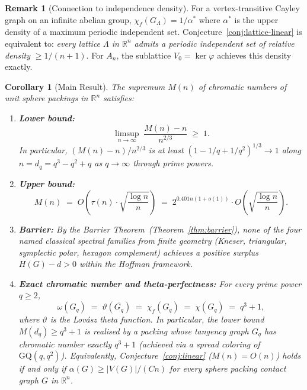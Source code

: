 \documentclass{article}
\newtheorem{corollary}[theorem]{Corollary}
\theoremstyle{definition}
\newtheorem{remark}[theorem]{Remark}
\begin{document}
\begin{remark}[Connection to independence density]\label{rem:indep-density}
For a vertex-transitive Cayley graph on an infinite abelian group, $\chi_f(G_\Lambda) = 1/\alpha^*$ where $\alpha^*$ is the upper density of a maximum periodic independent set.  Conjecture~\ref{conj:lattice-linear} is equivalent to: \emph{every lattice $\Lambda$ in $\mathbb{R}^n$ admits a periodic independent set of relative density $\ge 1/(n+1)$}.  For $A_n$, the sublattice $V_0 = \ker\varphi$ achieves this density exactly.
\end{remark}

\begin{corollary}[Main Result]\label{cor:main}
The supremum $M(n)$ of chromatic numbers of unit sphere packings in $\mathbb{R}^n$ satisfies:
\begin{enumerate}
\item[\textup{(i)}] \textbf{Lower bound:}
\[
  \limsup_{n\to\infty}\;\frac{M(n)-n}{n^{2/3}}\;\ge\;1.
\]
In particular, $(M(n)-n)/n^{2/3}$ is at least $(1-1/q+1/q^2)^{1/3}\to 1$ along $n=d_q=q^3-q^2+q$ as $q\to\infty$ through prime powers.
\item[\textup{(ii)}] \textbf{Upper bound:}
\[
  M(n)\;=\;O\!\left(\tau(n)\cdot\sqrt{\frac{\log n}{n}}\right)
  \;=\;2^{0.401n(1+o(1))}\cdot O\!\left(\sqrt{\frac{\log n}{n}}\right).
\]
\item[\textup{(iii)}] \textbf{Barrier:} By the Barrier Theorem~\textup{(Theorem~\ref{thm:barrier})}, none of the four named classical spectral families from finite geometry (Kneser, triangular, symplectic polar, hexagon complement) achieves a positive surplus $H(G)-d>0$ within the Hoffman framework.
\item[\textup{(iv)}] \textbf{Exact chromatic number and theta-perfectness:} For every prime power $q\ge 2$,
\[
  \omega(G_q) \;=\; \vartheta(\overline{G_q}) \;=\; \chi_f(G_q) \;=\; \chi(G_q) \;=\; q^3+1,
\]
where $\vartheta$ is the Lov\'asz theta function.  In particular, the lower bound $M(d_q)\ge q^3+1$ is realised by a packing whose tangency graph $G_q$ has chromatic number exactly $q^3+1$ (achieved via a spread coloring of $\mathrm{GQ}(q,q^2)$).  Equivalently, Conjecture~\ref{conj:linear} ($M(n)=O(n)$) holds if and only if $\alpha(G)\ge |V(G)|/(Cn)$ for every sphere packing contact graph $G$ in $\mathbb{R}^n$.
\end{enumerate}
\end{corollary}
\end{document}
